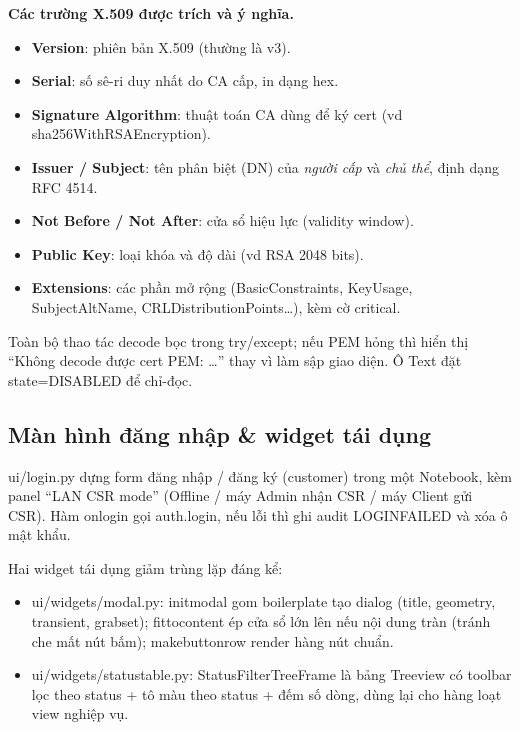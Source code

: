 \documentclass[12pt,a4paper]{article}
\newcommand{\code}[1]{{\ttfamily\small\def\_{\textunderscore\discretionary{}{}{}}#1}}
\begin{document}
\textbf{Các trường X.509 được trích và ý nghĩa.}
\begin{itemize}
  \item \textbf{Version}: phiên bản X.509 (thường là v3).
  \item \textbf{Serial}: số sê-ri duy nhất do CA cấp, in dạng hex.
  \item \textbf{Signature Algorithm}: thuật toán CA dùng để ký cert (vd
        \code{sha256WithRSAEncryption}).
  \item \textbf{Issuer / Subject}: tên phân biệt (DN) của \emph{người cấp} và
        \emph{chủ thể}, định dạng RFC 4514.
  \item \textbf{Not Before / Not After}: cửa sổ hiệu lực (validity window).
  \item \textbf{Public Key}: loại khóa và độ dài (vd RSA 2048 bits).
  \item \textbf{Extensions}: các phần mở rộng (BasicConstraints, KeyUsage,
        SubjectAltName, CRLDistributionPoints\dots), kèm cờ \code{critical}.
\end{itemize}

\begin{notebox}
Toàn bộ thao tác decode bọc trong \code{try/except}; nếu PEM hỏng thì hiển thị
``Không decode được cert PEM: \dots'' thay vì làm sập giao diện. Ô \code{Text} đặt
\code{state=DISABLED} để chỉ-đọc.
\end{notebox}

\subsection{Màn hình đăng nhập \& widget tái dụng}

\code{ui/login.py} dựng form đăng nhập / đăng ký (customer) trong một
\code{Notebook}, kèm panel ``LAN CSR mode'' (Offline / máy Admin nhận CSR / máy
Client gửi CSR). Hàm \code{on\_login} gọi \code{auth.login}, nếu lỗi thì ghi audit
\code{LOGIN\_FAILED} và xóa ô mật khẩu.

Hai widget tái dụng giảm trùng lặp đáng kể:
\begin{itemize}
  \item \code{ui/widgets/modal.py}: \code{init\_modal} gom boilerplate tạo dialog
        (title, geometry, \code{transient}, \code{grab\_set}); \code{fit\_to\_content}
        ép cửa sổ lớn lên nếu nội dung tràn (tránh che mất nút bấm);
        \code{make\_button\_row} render hàng nút chuẩn.
  \item \code{ui/widgets/status\_table.py}: \code{StatusFilterTreeFrame} là bảng
        Treeview có toolbar lọc theo status + tô màu theo status + đếm số dòng,
        dùng lại cho hàng loạt view nghiệp vụ.
\end{itemize}
\end{document}
